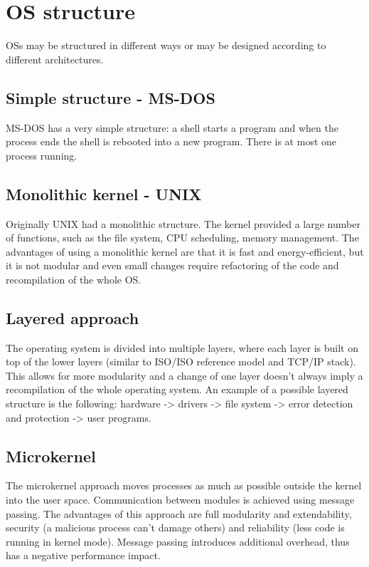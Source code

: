 \section{OS structure}
OSs may be structured in different ways or may be designed according to different architectures.
\subsection{Simple structure - MS-DOS}
MS-DOS has a very simple structure: a shell starts a program and when the process ends the shell is rebooted into a new program. There is at most one process running.
\subsection{Monolithic kernel - UNIX}
Originally UNIX had a monolithic structure. The kernel provided a large number of functions, such as the file system, CPU scheduling, memory management. The advantages of using a monolithic kernel are that it is fast and energy-efficient, but it is not modular and even small changes require refactoring of the code and recompilation of the whole OS.
\subsection{Layered approach}
The operating system is divided into multiple layers, where each layer is built on top of the lower layers (similar to ISO/ISO reference model and TCP/IP stack). This allows for more modularity and a change of one layer doesn't always imply a recompilation of the whole operating system. An example of a possible layered structure is the following: hardware -> drivers -> file system -> error detection and protection -> user programs.
\subsection{Microkernel}
The microkernel approach moves processes as much as possible outside the kernel into the user space. Communication between modules is achieved using message passing. The advantages of this approach are full modularity and extendability, security (a malicious process can't damage others) and reliability (less code is running in kernel mode). Message passing introduces additional overhead, thus has a negative performance impact.
